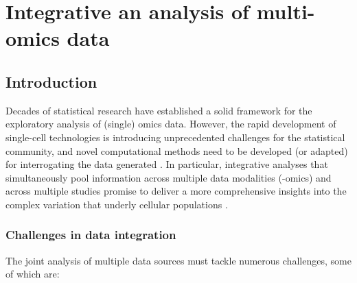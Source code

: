 \chapter{Integrative an analysis of multi-omics data}

\section{Introduction}
Decades of statistical research have established a solid framework for the exploratory analysis of (single) omics data. However, the rapid development of single-cell technologies is introducing unprecedented challenges for the statistical community, and novel computational methods need to be developed (or adapted) for interrogating the data generated \cite{Stegle2015}. In particular, integrative analyses that simultaneously pool information across multiple data modalities (-omics) and across multiple studies promise to deliver a more comprehensive insights into the complex variation that underly cellular populations \cite{Stuart2019,Colome-Tatche2018}.\\

\subsection{Challenges in data integration}
The joint analysis of multiple data sources must tackle numerous challenges, some of which are:

